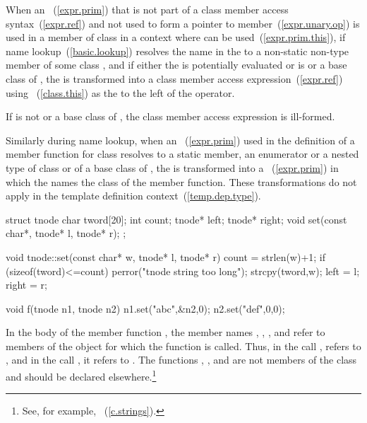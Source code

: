 \pnum
When an ~(\ref{expr.prim}) that is not part of a
class member access syntax~(\ref{expr.ref}) and not used to form a
pointer to member~(\ref{expr.unary.op}) is used in
a member of class  in a context where  can be
used~(\ref{expr.prim.this}),
if name
lookup~(\ref{basic.lookup}) resolves the name in the
 to a non-static non-type member of some class
,
and if either the  is potentially evaluated or
 is  or a base class of ,
the  is transformed into a class
member access expression~(\ref{expr.ref}) using
~(\ref{class.this}) as the 
to the left of the  operator.
\begin{note}
If  is not  or a base class of , the class
member access expression is ill-formed.
\end{note}
Similarly during name lookup, when an
~(\ref{expr.prim}) used in the definition of a
member function for class  resolves to a static member,
an enumerator or a nested type of class  or of a base class of
, the  is transformed into a
~(\ref{expr.prim}) in which the
 names the class of the member function.
These transformations do not apply in the
template definition context~(\ref{temp.dep.type}).
%
\begin{example}

\begin{codeblock}
struct tnode {
  char tword[20];
  int count;
  tnode* left;
  tnode* right;
  void set(const char*, tnode* l, tnode* r);
};

void tnode::set(const char* w, tnode* l, tnode* r) {
  count = strlen(w)+1;
  if (sizeof(tword)<=count)
      perror("tnode string too long");
  strcpy(tword,w);
  left = l;
  right = r;
}

void f(tnode n1, tnode n2) {
  n1.set("abc",&n2,0);
  n2.set("def",0,0);
}
\end{codeblock}

In the body of the member function , the member names
, , , and  refer to
members of the object for which the function is called. Thus, in the
call ,  refers to
, and in the call , it refers
to . The functions , , and
 are not members of the class  and should be
declared elsewhere.\footnote{See, for example, ~(\ref{c.strings}).}
\end{example}

